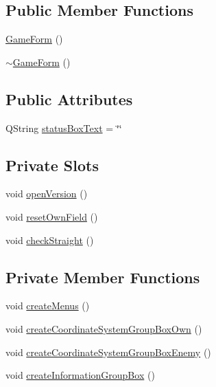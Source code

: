 \subsection*{Public Member Functions}
\begin{DoxyCompactItemize}
\item 
\hyperlink{classGameForm_ae853c67cf61b3a8128ded1b1c18171cb}{Game\+Form} ()
\item 
\hyperlink{classGameForm_a8020ae990541b81e274d003ed1eeeb59}{$\sim$\+Game\+Form} ()
\end{DoxyCompactItemize}
\subsection*{Public Attributes}
\begin{DoxyCompactItemize}
\item 
Q\+String \hyperlink{classGameForm_a6b42c6ec1657cd85c98c46fcfd126046}{status\+Box\+Text} = \char`\"{}\char`\"{}
\end{DoxyCompactItemize}
\subsection*{Private Slots}
\begin{DoxyCompactItemize}
\item 
void \hyperlink{classGameForm_a8b722117b1f1f02aeb60af137ee2d446}{open\+Version} ()
\item 
void \hyperlink{classGameForm_a57fd57ebca600cae3a27f5c768cf0e2d}{reset\+Own\+Field} ()
\item 
void \hyperlink{classGameForm_acc5a7e6e3595b7a835ed0ad3aeb4df73}{check\+Straight} ()
\end{DoxyCompactItemize}
\subsection*{Private Member Functions}
\begin{DoxyCompactItemize}
\item 
void \hyperlink{classGameForm_a5c788b6fcb676c3e1cef7e01eed9a420}{create\+Menus} ()
\item 
void \hyperlink{classGameForm_aacac9e13e6b6a0e20730e8fc831fbf75}{create\+Coordinate\+System\+Group\+Box\+Own} ()
\item 
void \hyperlink{classGameForm_a26921e3aabc5bc459af0414c3ab4de06}{create\+Coordinate\+System\+Group\+Box\+Enemy} ()
\item 
void \hyperlink{classGameForm_ac4d7e3039b39795dcc72a68cc7324e1e}{create\+Information\+Group\+Box} ()
\end{DoxyCompactItemize}
